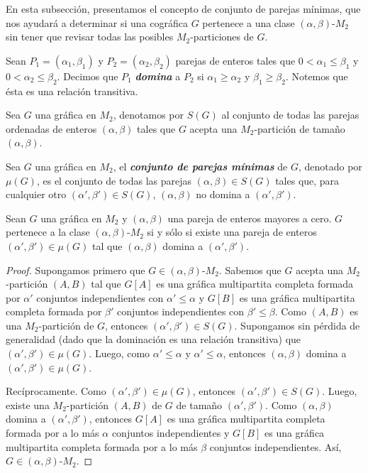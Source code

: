 En esta subsección, presentamos el concepto de conjunto de parejas mínimas, que nos ayudará a determinar si una cográfica $G$ pertenece a una clase $(\alpha, \beta)$-$M_2$ sin tener que revisar todas las posibles $M_2$-particiones de $G$.

Sean $P_1=(\alpha_1, \beta_1)$ y $P_2=(\alpha_2, \beta_2)$ parejas de enteros tales que $0 < \alpha_1 \le \beta_1$ y $0 < \alpha_2 \le \beta_2$. Decimos que $P_1$ \emph{\textbf{domina}} a $P_2$ si $\alpha_1 \geq \alpha_2$ y $\beta_1 \geq \beta_2$. Notemos que ésta es una relación transitiva.

Sea $G$ una gráfica en $M_2$, denotamos por $S(G)$ al conjunto de todas las parejas ordenadas de enteros $(\alpha, \beta)$ tales que $G$ acepta una $M_2$-partición de tamaño $(\alpha, \beta)$.

Sea $G$ una gráfica en $M_2$, el \textbf{\emph{conjunto de parejas mínimas}} de $G$, denotado por $\mu(G)$, es el conjunto de todas las parejas $(\alpha, \beta)\in S(G)$ tales que, para cualquier otro $(\alpha', \beta')\in S(G)$, $(\alpha, \beta)$ no domina a $(\alpha', \beta')$.

\begin{lemma}
Sean $G$ una gráfica en $M_2$ y $(\alpha, \beta)$ una pareja de enteros mayores a cero. $G$ pertenece a la clase $(\alpha, \beta)$-$M_2$ si y sólo si existe una pareja de enteros $(\alpha', \beta')\in \mu(G)$ tal que $(\alpha, \beta)$ domina a $(\alpha', \beta')$.
\end{lemma}

\begin{proof}
Supongamos primero que $G\in (\alpha, \beta)\text{-}M_2$. Sabemos que $G$ acepta una $M_2$-partición $(A,B)$ tal que $G[A]$ es una gráfica multipartita completa formada por $\alpha'$ conjuntos independientes con $\alpha' \le \alpha$ y $G[B]$ es una gráfica multipartita completa formada por $\beta'$ conjuntos independientes con $\beta' \le \beta$. Como $(A,B)$ es una $M_2$-partición de $G$, entonces $(\alpha', \beta')\in S(G)$. Supongamos sin pérdida de generalidad (dado que la dominación es una relación transitiva) que $(\alpha', \beta')\in \mu(G)$. Luego, como $\alpha' \le \alpha$ y $\alpha' \le \alpha$, entonces $(\alpha, \beta)$ domina a $(\alpha', \beta') \in \mu(G)$.

Recíprocamente. Como $(\alpha', \beta')\in \mu(G)$, entonces $(\alpha', \beta')\in S(G)$. Luego, existe una $M_2$-partición $(A,B)$ de $G$ de tamaño $(\alpha', \beta')$. Como $(\alpha, \beta)$ domina a $(\alpha', \beta')$, entonces $G[A]$ es una gráfica multipartita completa formada por a lo más $\alpha$ conjuntos independientes y $G[B]$ es una gráfica multipartita completa formada por a lo más $\beta$ conjuntos independientes. Así, $G\in (\alpha, \beta)\text{-}M_2$.
\end{proof}
